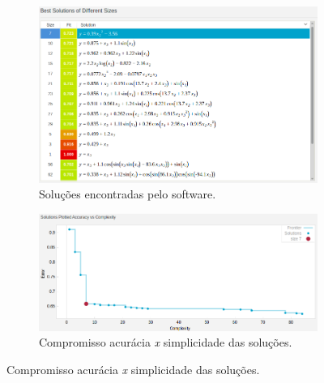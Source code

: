 	\begin{figure}[h!]
	
	\centering
	
		\begin{subfigure}{.45\textwidth} 
		  \centering
		  \includegraphics[width=1\linewidth]{image/solucoes_map2_r}
		  \caption{\centering Soluções encontradas pelo software.} 
		  \label{fig:map2_solucoes_c_ruido} 
		\end{subfigure}%
		\begin{subfigure}{.55\textwidth}
		  \centering
		  \includegraphics[width=1\linewidth]{image/pareto_map2_r}
		  \caption{\centering Compromisso acurácia \textit{x} simplicidade das
		  soluções.}
		  \label{fig:map2_pareto_c_ruido} 
		\end{subfigure}
	

\end{figure}
